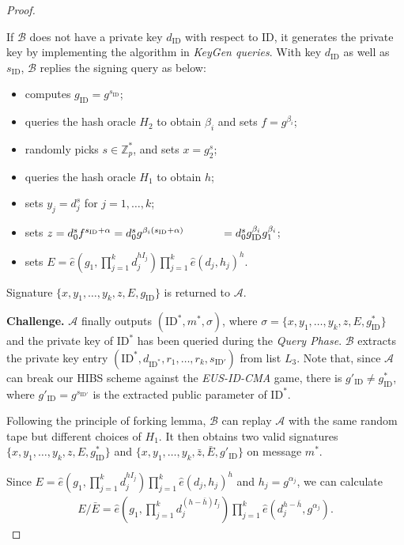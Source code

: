 \documentclass[times]{secauth}
\theoremstyle{definition}
\theoremstyle{remark}
\begin{document}
\begin{proof}
\begin{itemize}
	If $\mathcal{B}$ does not have a private key $d_{\mathrm{ID}}$ with respect to ID, it generates the private key by implementing the algorithm in \emph{KeyGen queries}. 
With key $d_\mathrm{ID}$ as well as $s_\mathrm{ID}$, $\mathcal{B}$ replies the signing query as below:
	\begin{itemize}
		\item computes $g_\mathrm{ID} = g^{s_\mathrm{ID}}$;
		\item queries the hash oracle $H_2$ to obtain $\beta_i$ and sets $f = g^{\beta_i}$;
		\item randomly picks $s \in \mathbb{Z}_p^*$, and sets $x = g_2^s$;
		\item queries the hash oracle $H_1$ to obtain $h$;
		\item sets $y_j = d_j^s$ for $j = 1,\ldots, k$;
		\item sets $z= d_0^{s} f^{s_\mathrm{ID}+\alpha} = d_0^{s}g^{\beta_i(s_\mathrm{ID}+\alpha)} \\
		~~~~~~~~~~= d_0^{s}g_\mathrm{ID}^{\beta_i}g_1^{\beta_i}$;
		\item sets $E= \hat{e}(g_1, \prod_{j=1}^{k} d_j^{hI_j})\prod_{j=1}^{k} \hat{e}(d_j, h_j)^h$.	
	\end{itemize}
	Signature $\{x, y_1, \ldots, y_k, z, E, g_{\mathrm{ID}}\}$ is returned to $\mathcal{A}$.
\end{itemize}
\textbf{Challenge.} 
$\mathcal{A}$ finally outputs $(\mathrm{ID}^*, m^*, \sigma)$, where $ \sigma=\{x, y_1, \ldots, y_k, z, E, g^*_\mathrm{ID}\}$ and the private key of $\mathrm{ID}^*$ has been queried during the \emph{Query Phase}. 
$\mathcal{B}$ extracts the private key entry $(\mathrm{ID}^*, d_{\mathrm{ID}^*}, r_1, \ldots, r_k, s_{\mathrm{ID}'})$ from list $L_3$. 
Note that, since $\mathcal{A}$ can break our HIBS scheme against the \emph{EUS-ID-CMA} game, there is $g'_\mathrm{ID} \neq g^*_\mathrm{ID}$, where $g'_\mathrm{ID} = g^{s_{\mathrm{ID}'}}$ is the extracted public parameter of $\mathrm{ID}^*$.
\par
Following the principle of forking lemma, $\mathcal{B}$ can replay $\mathcal{A}$ with the same random tape but different choices of $H_1$.
It then obtains two valid signatures $\{x, y_1, \ldots, y_k, z, E, g^*_\mathrm{ID}\}$ and $\{x, y_1, \ldots, y_k, \bar{z}, \bar{E}, g'_\mathrm{ID}\}$ on message $m^*$. 
\par
Since $E= \hat{e}(g_1, \prod_{j=1}^{k} d_j^{hI_j})\prod_{j=1}^{k} \hat{e}(d_j, h_j)^h$ and $h_j = g^{\alpha_j}$, we can calculate
\begin{align*}
E/\bar{E} = \hat{e}(g_1, \prod_{j=1}^k d_j^{(h-\bar{h})I_j})\prod_{j=1}^k \hat{e}(d_j^{h-\bar{h}}, g^{\alpha_j}).
\end{align*}


\end{proof}
\end{document}
